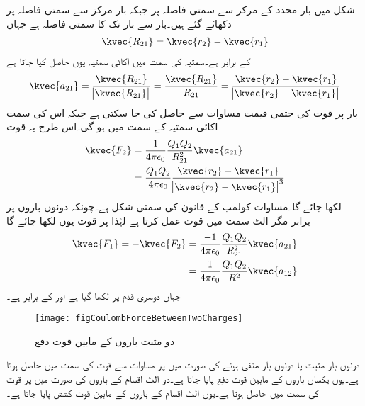 شکل  میں بار  محدد کے مرکز سے سمتی فاصلہ  پر جبکہ بار  مرکز سے سمتی فاصلہ  پر دکھائے گئے ہیں۔بار  سے بار  تک کا سمتی فاصلہ  ہے جہاں
\begin{align}
\kvec{R_{21}}=\kvec{r_2}-\kvec{r_1}
\end{align}
کے برابر ہے۔سمتیہ  کی سمت میں اکائی سمتیہ  یوں حاصل کیا جاتا ہے
\begin{align}
\kvec{a_{21}}=\frac{\kvec{R_{21}}}{\abs{\kvec{R_{21}}}}=\frac{\kvec{R_{21}}}{R_{21}}=\frac{\kvec{r_2}-\kvec{r_1}}{\abs{\kvec{r_2}-\kvec{r_1}}}
\end{align}
بار  پر قوت  کی حتمی قیمت مساوات   سے حاصل کی جا سکتی ہے جبکہ اس کی سمت اکائی سمتیہ  کے سمت میں ہو گی۔اس طرح یہ قوت
\begin{gather}
\begin{aligned}\label{مساوات_کولمب_قوت_کی_مساوات_الف}
\kvec{F_2}&=\frac{1}{4 \pi \epsilon_0}\frac{Q_1 Q_2}{ R_{21}^2} {\kvec{a_{21}}}\\
&=\frac{Q_1 Q_2}{4 \pi \epsilon_0}\frac{\kvec{r_2}-\kvec{r_1}}{\abs{\kvec{r_2}-\kvec{r_1}}^3}
\end{aligned}
\end{gather}
لکھا جائے گا۔مساوات  کولمب کے قانون کی سمتی شکل ہے۔چونکہ دونوں باروں پر برابر مگر الٹ سمت میں قوت عمل کرتا ہے لہٰذا  پر قوت  یوں لکھا جائے گا
 \begin{gather}
\begin{aligned}
\kvec{F_1}=-\kvec{F_2}&=\frac{-1}{4 \pi \epsilon_0}\frac{Q_1 Q_2}{ R_{21}^2} \kvec{a_{21}}\\
&=\frac{1}{4 \pi \epsilon_0}\frac{Q_1 Q_2}{ R^2} {\kvec{a_{12}}}
\end{aligned}
\end{gather}
جہاں دوسری قدم پر  لکھا گیا ہے اور  کے برابر ہے۔
%
\begin{figure}
\centering
\texttt{[image: figCoulombForceBetweenTwoCharges]}
\caption{دو مثبت باروں کے مابین قوت دفع}
\label{شکل_سمتیہ_دو_مثبت_بار_قوت_دفع}
\end{figure}
دونوں بار مثبت یا دونوں بار منفی ہونے کی صورت میں  پر مساوات  سے قوت  کی سمت میں حاصل ہوتا ہے۔یوں یکساں باروں کے مابین قوت دفع پایا جاتا ہے۔دو الٹ اقسام کے باروں کی صورت میں  پر قوت  کی سمت میں حاصل ہوتا ہے۔یوں الٹ اقسام کے باروں کے مابین قوت کشش پایا جاتا ہے۔  

